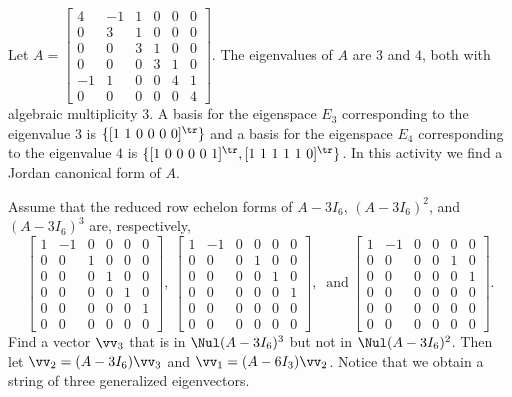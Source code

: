 \begin{activity} Let $A = \left[ \begin{array}{rrcccc} 4&-1&1&0&0&0 \\ 0&3&1&0&0&0 \\ 0&0&3&1&0&0 \\ 0&0&0&3&1&0 \\ -1&1&0&0&4&1 \\ 0&0&0&0&0&4 \end{array} \right]$. The eigenvalues of $A$ are $3$ and $4$, both with algebraic multiplicity 3. A basis for the eigenspace $E_3$ corresponding to the eigenvalue $3$ is $\{[1 \ 1 \ 0 \ 0 \ 0 \ 0]^{\tr}\}$ and a basis for the eigenspace $E_4$ corresponding to the eigenvalue $4$ is $\{[1 \ 0 \ 0 \ 0 \ 0 \ 1]^{\tr}, [1 \ 1 \ 1 \ 1 \ 1 \ 0]^{\tr}\}$. In this activity we find a Jordan canonical form of $A$. 
\ba
\item Assume that the reduced row echelon forms of $A -3 I_6$, $(A-3I_6)^2$, and $(A-3I_6)^3$ are, respectively, 
\[ \left[ \begin{array}{crcccc} 1&-1&0&0&0&0\\ 0&0&1&0&0&0 \\ 0&0&0&1&0&0\\ 0&0&0&0&1&0 \\ 0&0&0&0&0&1 \\ 0&0&0&0&0&0\end{array} \right], \ \left[ \begin{array}{crcccc} 1&-1&0&0&0&0\\ 0&0&0&1&0&0\\ 0&0&0&0&1&0\\ 0&0&0&0&0&1 \\ 0&0&0&0&0&0 \\ 0&0&0&0&0&0 \end {array} \right],  \ \text{ and} \  \left[ \begin{array}{crcccc} 1&-1&0&0&0&0\\ 0&0&0&0&1&0\\ 0&0&0&0&0&1\\ 0&0&0&0&0&0 \\ 0&0&0&0&0&0 \\ 0&0&0&0&0&0 \end {array} \right].\]
Find a vector $\vv_3$ that is in $\Nul (A-3I_6)^3$ but not in $\Nul (A-3I_6)^2$. Then let $\vv_2 = (A-3I_6)\vv_3$ and $\vv_1 = (A-6I_3)\vv_2$. Notice that we obtain a string of three generalized eigenvectors. 


\end{activity}
